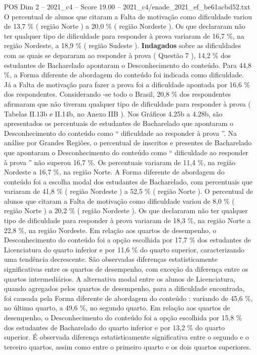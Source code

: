 \begin{textsample}{POS Dim 2 – 2021\_c4 – Score 19.00 – 2021\_c4/enade\_2021\_ef\_be61acbd52.txt}
O percentual de alunos que citaram a Falta de motivação como dificuldade variou de 13,7 \% ( região Norte ) a 20,0 \% ( região Nordeste ).
Os que declararam não ter qualquer tipo de dificuldade para responder à prova variaram de 16,7 \%, na região Nordeste, a 18,9 \% ( região Sudeste ). \textbf{Indagados} sobre as dificuldades com as quais se depararam ao responder à prova ( Questão 7 ), 14,2 \% dos estudantes de Bacharelado apontaram o Desconhecimento do conteúdo.
Para 44,8 \%, a Forma diferente de abordagem do conteúdo foi indicada como dificuldade.
Já a Falta de motivação para fazer a prova foi a dificuldade apontada por 16,6 \% dos respondentes.
Considerando -se todo o Brasil, 20,8 \% dos respondentes afirmaram que não tiveram qualquer tipo de dificuldade para responder à prova ( Tabelas II.13b e II.14b, no Anexo IIB ).
Nos Gráficos 4.25b a 4.28b, são apresentados os percentuais de estudantes de Bacharelado que apontaram o Desconhecimento do conteúdo como “ dificuldade ao responder à prova ”.
Na análise por Grandes Regiões, o percentual de inscritos e presentes de Bacharelado que apontaram o Desconhecimento do conteúdo como “ dificuldade ao responder à prova ” não superou 16,7 \%.
Os percentuais variaram de 11,4 \%, na região Nordeste a 16,7 \%, na região Norte.
A Forma diferente de abordagem do conteúdo foi a escolha modal dos estudantes de Bacharelado, com percentuais que variaram de 41,8 \% ( região Nordeste ) a 52,5 \% ( região Norte ).
O percentual de alunos que citaram a Falta de motivação como dificuldade variou de 8,0 \% ( região Norte ) a 20,2 \% ( região Nordeste ).
Os que declararam não ter qualquer tipo de dificuldade para responder à prova variaram de 18,3 \%, na região Norte a 22,8 \%, na região Nordeste.
Em relação aos quartos de desempenho, o Desconhecimento do conteúdo foi a opção escolhida por 17,7 \% dos estudantes de Licenciatura do quarto inferior e por 11,6 \% do quarto superior, caracterizando uma tendência decrescente.
São observadas diferenças estatisticamente significativas entre os quartos de desempenho, com exceção da diferença entre os quartos intermediários.
A alternativa modal entre os alunos de Licenciatura, quando agregados pelos quartos de desempenho, para a dificuldade encontrada, foi causada pela Forma diferente de abordagem do conteúdo : variando de 45,6 \%, no último quarto, a 49,6 \%, no segundo quarto.
Em relação aos quartos de desempenho, o Desconhecimento do conteúdo foi a opção escolhida por 15,8 \% dos estudantes de Bacharelado do quarto inferior e por 13,2 \% do quarto superior.
É observada diferença estatisticamente significativa entre o segundo e o terceiro quartos, assim como entre o primeiro quarto e os dois quartos superiores.

\end{textsample}

